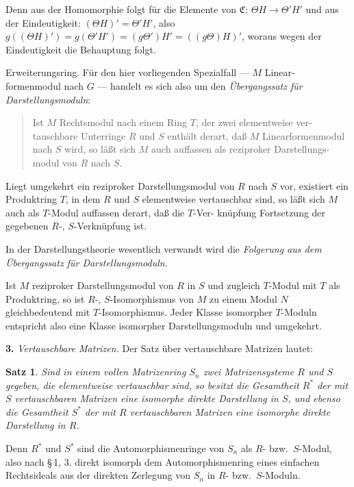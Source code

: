 \documentclass[12pt,a4paper]{article}
\theoremstyle{plain}
\newtheorem*{satz}{Satz}
\newcommand{\setC}{\mathfrak{C}}
\begin{document}
Denn aus der Homomorphie folgt f\"ur die Elemente von $\setC$: $\Theta H \to \Theta' H'$
und aus der Eindeutigkeit: $(\Theta H)' = \Theta' H'$, also $g((\Theta H)') = g(\Theta' H') = (g\Theta')H' =
((g\Theta)H)'$, woraus wegen der Eindeutigkeit die Behauptung folgt.


\medskip
\noindent
Erweiterungsring. F\"ur den hier vorliegenden Spezialfall --- $M$ Linear-
formenmodul nach $G$ --- handelt es sich also um den \emph{\"Ubergangssatz
f\"ur Darstellungsmoduln}:

\begin{quote}
Ist $M$ Rechtsmodul nach einem Ring $T$, der zwei elementweise ver-
tauschbare Unterringe $R$ und $S$ enth\"alt derart, da\ss{} $M$ Linearformenmodul
nach $S$ wird, so l\"a\ss t sich $M$ auch auffassen als reziproker Darstellungs-
modul von $R$ nach $S$.
\end{quote}

Liegt umgekehrt ein reziproker Darstellungsmodul von $R$ nach $S$ vor,
existiert ein Produktring $T$, in dem $R$ und $S$ elementweise vertauschbar
sind, so l\"a\ss t sich $M$ auch als $T$-Modul auffassen derart, da\ss{} die $T$-Ver-
kn\"upfung Fortsetzung der gegebenen $R$-, $S$-Verkn\"upfung ist.

In der Darstellungstheorie wesentlich verwandt wird die
\emph{Folgerung aus dem \"Ubergangssatz f\"ur Darstellungsmoduln}.

Ist $M$ reziproker Darstellungsmodul von $R$ in $S$ und zugleich $T$-Modul
mit $T$ als Produktring, so ist $R$-, $S$-Isomorphismus von $M$ zu einem
Modul $N$ gleichbedeutend mit $T$-Isomorphismus. Jeder Klasse isomorpher
$T$-Moduln entspricht also eine Klasse isomorpher Darstellungsmoduln
und umgekehrt.

\medskip
\noindent\textbf{3.}\hspace{0.5em}%
\emph{Vertauschbare Matrizen.} Der Satz \"uber vertauschbare Matrizen
lautet:

\begin{satz}
Sind in einem vollen Matrizenring $S_n$ zwei Matrizensysteme $R$
und $S$ gegeben, die elementweise vertauschbar sind, so besitzt die
Gesamtheit $R^*$ der mit $S$ vertauschbaren Matrizen eine isomorphe
direkte Darstellung in $S$, und ebenso die Gesamtheit $S^*$ der mit $R$
vertauschbaren Matrizen eine isomorphe direkte Darstellung in $R$.
\end{satz}

Denn $R^*$ und $S^*$ sind die Automorphismenringe von $S_n$ als $R$- bzw.\ $S$-Modul,
also nach \S\,1, 3. direkt isomorph dem Automorphismenring eines einfachen
Rechtsideals aus der direkten Zerlegung von $S_n$ in $R$- bzw.\ $S$-Moduln.
\end{document}
